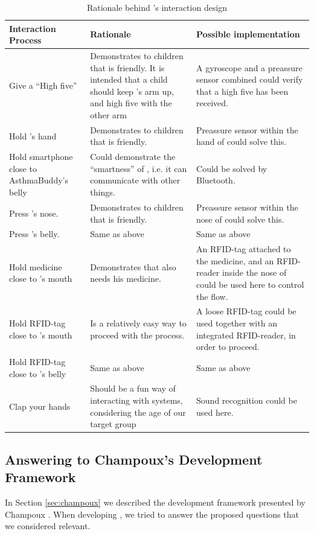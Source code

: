 \begin{table}[H]
	\begin{tabular}{| p{3.0cm} | p{5.5cm} | p{5.5cm} |}
		\hline
		\textbf{Interaction Process} & \textbf{Rationale} & \textbf{Possible implementation} \\
		\hline
		Give \buddy{} a ``High five'' & Demonstrates to children that \buddy{} is friendly. It is intended that a child should keep \buddy{}'s arm up, and high five \buddy{} with the other arm & A gyroscope and a preassure sensor combined could verify that a high five has been received. \\
		\hline
		Hold \buddy{}'s hand & Demonstrates to children that \buddy{} is friendly. & Preassure sensor within the hand of \buddy{} could solve this. \\
		\hline
		Hold smartphone close to AsthmaBuddy's belly & Could demonstrate the ``smartness'' of \buddy{}, i.e. it can communicate with other things. & Could be solved by Bluetooth. \\
		\hline 
		Press \buddy{}'s nose. & Demonstrates to children that \buddy{} is friendly. & Preassure sensor within the nose of \buddy{} could solve this. \\
		\hline
		Press \buddy{}'s belly. & Same as above & Same as above \\
		\hline
		Hold medicine close to \buddy{}'s mouth & Demonstrates that \buddy{} also needs his medicine. & An RFID-tag attached to the medicine, and an RFID-reader inside the nose of \buddy{} could be used here to control the flow. \\ 
		\hline
		Hold RFID-tag close to \buddy{}'s mouth & Is a relatively easy way to proceed with the process. & A loose RFID-tag could be used together with an integrated RFID-reader, in order to proceed. \\ 
		\hline
		Hold RFID-tag close to \buddy{}'s belly & Same as above & Same as above \\
		\hline
		Clap your hands & Should be a fun way of interacting with systems, considering the age of our target group & Sound recognition could be used here. \\ 
		\hline
	\end{tabular}
	\label{tab:interaction-rationale}
	\caption{Rationale behind \buddy{}'s interaction design}
\end{table}

\subsection{Answering to Champoux's Development Framework}
\label{sec:answeringchampoux}
In Section \ref{sec:champoux} we described the development framework presented by Champoux \etal{}. When developing \buddy{}, we tried to answer the proposed questions that we considered relevant. 

